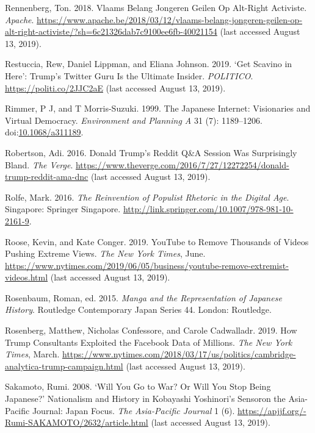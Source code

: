 \documentclass[10pt,british,A4paper,oneside]{memoir}
\begin{document}
\hypertarget{ref-rennenberg_vlaams_2018}{}
Rennenberg, Ton. 2018. Vlaams Belang Jongeren Geilen Op Alt-Right
Activiste. \emph{Apache}.
\url{https://www.apache.be/2018/03/12/vlaams-belang-jongeren-geilen-op-alt-right-activiste/?sh=6c21326dab7c9100ee6fb-40021154} (last accessed August 13, 2019).

\hypertarget{ref-restuccia_get_2019}{}
Restuccia, Rew, Daniel Lippman, and Eliana Johnson. 2019. `Get Scavino
in Here': Trump's Twitter Guru Is the Ultimate Insider. \emph{POLITICO}.
\url{https://politi.co/2JJC2aE} (last accessed August 13, 2019).

\hypertarget{ref-rimmer_japanese_1999}{}
Rimmer, P J, and T Morris-Suzuki. 1999. The Japanese Internet:
Visionaries and Virtual Democracy. \emph{Environment and Planning A} 31
(7): 1189--1206.
doi:\href{https://doi.org/10.1068/a311189}{10.1068/a311189}.

\hypertarget{ref-robertson_donald_2016}{}
Robertson, Adi. 2016. Donald Trump's Reddit Q\&A Session Was
Surprisingly Bland. \emph{The Verge}.
\url{https://www.theverge.com/2016/7/27/12272254/donald-trump-reddit-ama-dnc} (last accessed August 13, 2019).

\hypertarget{ref-rolfe_reinvention_2016}{}
Rolfe, Mark. 2016. \emph{The Reinvention of Populist Rhetoric in the
Digital Age}. Singapore: Springer Singapore.
\url{http://link.springer.com/10.1007/978-981-10-2161-9}.

\hypertarget{ref-roose_youtube_2019}{}
Roose, Kevin, and Kate Conger. 2019. YouTube to Remove Thousands of
Videos Pushing Extreme Views. \emph{The New York Times}, June.
\url{https://www.nytimes.com/2019/06/05/business/youtube-remove-extremist-videos.html} (last accessed August 13, 2019).

\hypertarget{ref-rosenbaum_manga_2015}{}
Rosenbaum, Roman, ed. 2015. \emph{Manga and the Representation of
Japanese History}. Routledge Contemporary Japan Series 44. London:
Routledge.

\hypertarget{ref-rosenberg_how_2019}{}
Rosenberg, Matthew, Nicholas Confessore, and Carole Cadwalladr. 2019.
How Trump Consultants Exploited the Facebook Data of Millions. \emph{The
New York Times}, March.
\url{https://www.nytimes.com/2018/03/17/us/politics/cambridge-analytica-trump-campaign.html} (last accessed August 13, 2019).

\hypertarget{ref-sakamoto_will_2008}{}
Sakamoto, Rumi. 2008. `Will You Go to War? Or Will You Stop Being
Japanese?' Nationalism and History in Kobayashi Yoshinori's Sensoron the
Asia-Pacific Journal: Japan Focus. \emph{The Asia-Pacific Journal} 1
(6). \url{https://apjjf.org/-Rumi-SAKAMOTO/2632/article.html} (last accessed August 13, 2019).
\end{document}

